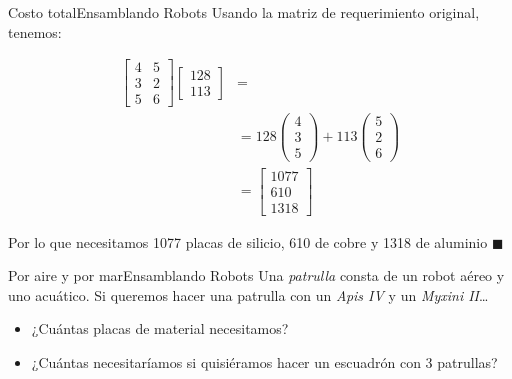 \documentclass[spanish, c]{beamer}
\begin{document}
\begin{frame}{Costo total}{Ensamblando Robots}
    Usando la matriz de requerimiento original, tenemos:

    \begin{align*}
        \begin{bmatrix} 4 & 5 \\ 3 & 2 \\ 5 & 6 \end{bmatrix}
        \begin{bmatrix} 128 \\ 113 \end{bmatrix} & = \\[2ex]
        & = 128 \begin{pmatrix} 4 \\ 3 \\ 5\end{pmatrix} + 113 \begin{pmatrix} 5 \\ 2 \\ 6 \end{pmatrix} \\[2ex]
        & = \begin{bmatrix} 1077 \\ 610 \\ 1318 \end{bmatrix}
    \end{align*}

    Por lo que necesitamos 1077 placas de silicio, 610 de cobre y 1318 de aluminio $\blacksquare$
\end{frame}

\begin{frame}{Por aire y por mar}{Ensamblando Robots}
    Una \textit{patrulla} consta de un robot aéreo y uno acuático.
    Si queremos hacer una patrulla con un \textit{Apis IV} y un \textit{Myxini II}\dots

    \bigskip
    
    \begin{itemize}
        \item ¿Cuántas placas de material necesitamos?
        \item ¿Cuántas necesitaríamos si quisiéramos hacer un escuadrón con 3 patrullas?
    \end{itemize}

\end{frame}




\end{document}
